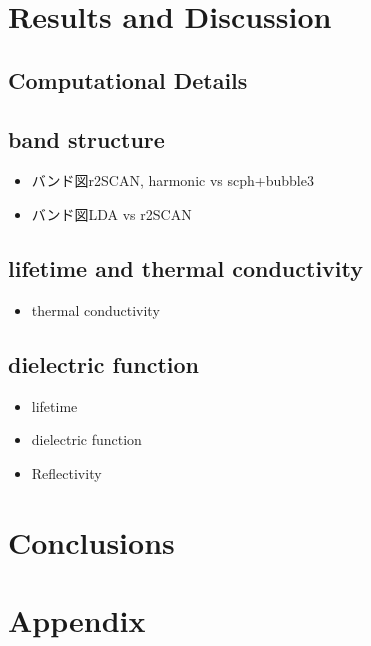 \documentclass[twocolumn,showpacs,prb,amsfonts,amsmath,amssymb,floatfix,groupedaddress]{revtex4-1}
\begin{document}
\section{Results and Discussion}

\subsection{Computational Details}

\subsection{band structure}





\begin{itemize}
 \item バンド図r2SCAN, harmonic vs scph+bubble3
 \item バンド図LDA vs r2SCAN
\end{itemize}


\subsection{lifetime and thermal conductivity}

\begin{itemize}
 \item thermal conductivity
\end{itemize}


\subsection{dielectric function}
\begin{itemize}
 \item lifetime
 \item dielectric function
 \item Reflectivity
\end{itemize}


\section{Conclusions}


\section{Appendix}




% 
\end{document}
